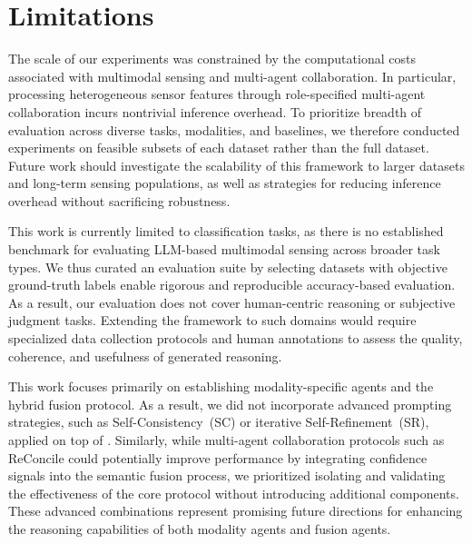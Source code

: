 \section*{Limitations}
\label{sec:limitations}

The scale of our experiments was constrained by the computational costs associated with multimodal sensing and multi-agent collaboration. In particular, processing heterogeneous sensor features through role-specified multi-agent collaboration incurs nontrivial inference overhead. To prioritize breadth of evaluation across diverse tasks, modalities, and baselines, we therefore conducted experiments on feasible subsets of each dataset rather than the full dataset. Future work should investigate the scalability of this framework to larger datasets and long-term sensing populations, as well as strategies for reducing inference overhead without sacrificing robustness.

This work is currently limited to classification tasks, as there is no established benchmark for evaluating LLM-based multimodal sensing across broader task types. We thus curated an evaluation suite by selecting datasets with objective ground-truth labels enable rigorous and reproducible accuracy-based evaluation. As a result, our evaluation does not cover human-centric reasoning or subjective judgment tasks. Extending the framework to such domains would require specialized data collection protocols and human annotations to assess the quality, coherence, and usefulness of generated reasoning.

This work focuses primarily on establishing modality-specific agents and the hybrid fusion protocol. As a result, we did not incorporate advanced prompting strategies, such as Self-Consistency~(SC) or iterative Self-Refinement~(SR), applied on top of \system{}. Similarly, while multi-agent collaboration protocols such as ReConcile could potentially improve performance by integrating confidence signals into the semantic fusion process, we prioritized isolating and validating the effectiveness of the core protocol without introducing additional components. These advanced combinations represent promising future directions for enhancing the reasoning capabilities of both modality agents and fusion agents.


